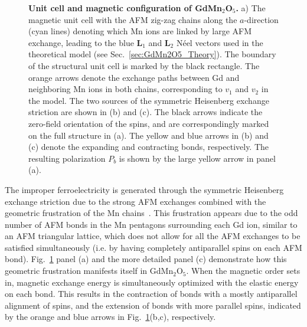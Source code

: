 \begin{figure}
	\caption{\label{fig:GdMn2O5_unit_cell}{\bf Unit cell and magnetic configuration of GdMn$_2$O$_5$.} a) The magnetic unit cell with the \gls{AFM} zig-zag chains along the $a$-direction (cyan lines) denoting which Mn ions are linked by large \gls{AFM} exchange, leading to the blue $\bm{L}_1$ and $\bm{L}_2$ N\'eel vectors used in the theoretical model (see Sec.~\ref{sec:GdMn2O5_Theory}). The boundary of the structural unit cell is marked by the black rectangle. The orange arrows denote the exchange paths between Gd and neighboring Mn ions in both chains, corresponding to $v_1$ and $v_2$ in the model. The two sources of the symmetric Heisenberg exchange striction are shown in (b) and (c). The black arrows indicate the zero-field orientation of the spins, and are correspondingly marked on the full structure in (a). The yellow and blue arrows in (b) and (c) denote the expanding and contracting bonds, respectively. The resulting polarization $P_b$ is shown by the large yellow arrow in panel (a).}
\end{figure}
The improper ferroelectricity is generated through the symmetric Heisenberg exchange striction due to the strong \gls{AFM} exchanges combined with the geometric frustration of the Mn chains~\cite{Choi2008}.
This frustration appears due to the odd number of \gls{AFM} bonds in the Mn pentagons surrounding each Gd ion, similar to an \gls{AFM} triangular lattice, which does not allow for all the \gls{AFM} exchanges to be satisfied simultaneously (i.e. by having completely antiparallel spins on each \gls{AFM} bond).
Fig.~\ref{fig:GdMn2O5_unit_cell} panel (a) and the more detailed panel (c) demonstrate how this geometric frustration manifests itself in GdMn$_2$O$_5$.
When the magnetic order sets in, magnetic exchange energy is simultaneously optimized with the elastic energy on each bond.
This results in the contraction of bonds with a mostly antiparallel alignment of spins, and the extension of bonds with more parallel spins, indicated by the orange and blue arrows in Fig.~\ref{fig:GdMn2O5_unit_cell}(b,c), respectively.

